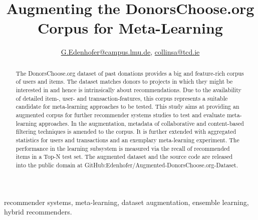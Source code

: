 \documentclass{IEEEtran}
\begin{document}
\title{Augmenting the DonorsChoose.org Corpus for Meta-Learning}
\author{



	\href{mailto:G.Edenhofer@campus.lmu.de}{G.Edenhofer@campus.lmu.de},
	\href{mailto:collinsa@tcd.ie}{collinsa@tcd.ie}
}

\maketitle  %

\begin{abstract}
The DonorsChoose.org dataset of past donations provides a big and feature-rich corpus of users and items. The dataset matches donors to projects in which they might be interested in and hence is intrinsically about recommendations. Due to the availability of detailed item-, user- and transaction-features, this corpus represents a suitable candidate for meta-learning approaches to be tested. This study aims at providing an augmented corpus for further recommender systems studies to test and evaluate meta-learning approaches. In the augmentation, metadata of collaborative and content-based filtering techniques is amended to the corpus. It is further extended with aggregated statistics for users and transactions and an exemplary meta-learning experiment. The performance in the learning subsystem is measured via the recall of recommended items in a Top-N test set. The augmented dataset and the source code are released into the public domain at GitHub:Edenhofer/Augmented-DonorsChoose.org-Dataset.
\end{abstract}

\begin{IEEEkeywords}
	recommender systems, meta-learning, dataset augmentation, ensemble learning, hybrid recommenders.
\end{IEEEkeywords}
\end{document}

